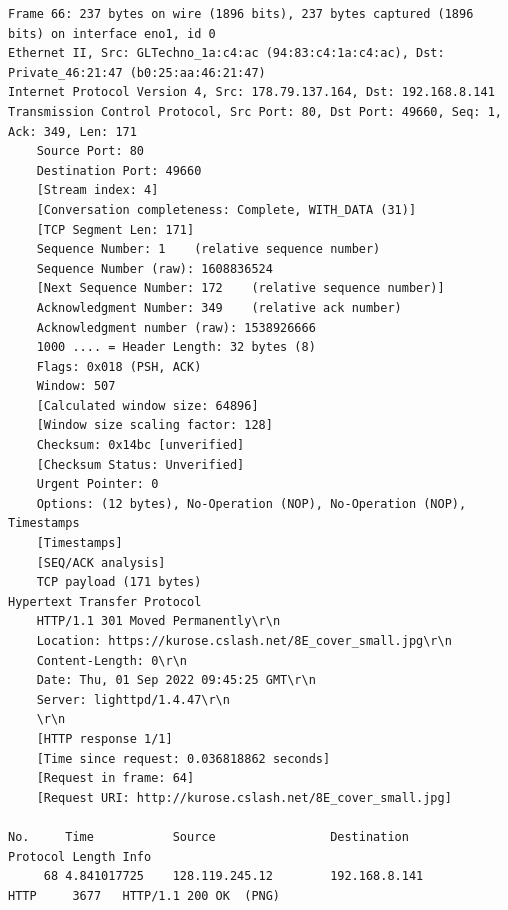 \documentclass[a4paper,11pt,final]{report}
\begin{document}
\begin{lstlisting}[breaklines]
Frame 66: 237 bytes on wire (1896 bits), 237 bytes captured (1896 bits) on interface eno1, id 0
Ethernet II, Src: GLTechno_1a:c4:ac (94:83:c4:1a:c4:ac), Dst: Private_46:21:47 (b0:25:aa:46:21:47)
Internet Protocol Version 4, Src: 178.79.137.164, Dst: 192.168.8.141
Transmission Control Protocol, Src Port: 80, Dst Port: 49660, Seq: 1, Ack: 349, Len: 171
    Source Port: 80
    Destination Port: 49660
    [Stream index: 4]
    [Conversation completeness: Complete, WITH_DATA (31)]
    [TCP Segment Len: 171]
    Sequence Number: 1    (relative sequence number)
    Sequence Number (raw): 1608836524
    [Next Sequence Number: 172    (relative sequence number)]
    Acknowledgment Number: 349    (relative ack number)
    Acknowledgment number (raw): 1538926666
    1000 .... = Header Length: 32 bytes (8)
    Flags: 0x018 (PSH, ACK)
    Window: 507
    [Calculated window size: 64896]
    [Window size scaling factor: 128]
    Checksum: 0x14bc [unverified]
    [Checksum Status: Unverified]
    Urgent Pointer: 0
    Options: (12 bytes), No-Operation (NOP), No-Operation (NOP), Timestamps
    [Timestamps]
    [SEQ/ACK analysis]
    TCP payload (171 bytes)
Hypertext Transfer Protocol
    HTTP/1.1 301 Moved Permanently\r\n
    Location: https://kurose.cslash.net/8E_cover_small.jpg\r\n
    Content-Length: 0\r\n
    Date: Thu, 01 Sep 2022 09:45:25 GMT\r\n
    Server: lighttpd/1.4.47\r\n
    \r\n
    [HTTP response 1/1]
    [Time since request: 0.036818862 seconds]
    [Request in frame: 64]
    [Request URI: http://kurose.cslash.net/8E_cover_small.jpg]

No.     Time           Source                Destination           Protocol Length Info
     68 4.841017725    128.119.245.12        192.168.8.141         HTTP     3677   HTTP/1.1 200 OK  (PNG)


\end{lstlisting}
\end{document}
